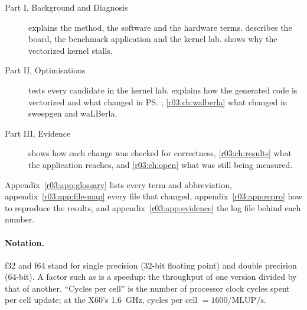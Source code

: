 \begin{description}
  \item[Part I, Background and Diagnosis]  explains the method, the
        software and the hardware terms.  describes the board, the
        benchmark application and the kernel lab.  shows why the
        vectorized kernel stalls.
  \item[Part II, Optimisations]  tests every candidate in the kernel
        lab.  explains how the generated code is vectorized and what
        changed in \ps{}; \cref{r03:ch:walberla} what changed in sweepgen and waLBerla.
  \item[Part III, Evidence]  shows how each change was checked
        for correctness, \cref{r03:ch:results} what the application reaches, and
        \cref{r03:ch:open} what was still being measured.
\end{description}
Appendix~\ref{r03:app:glossary} lists every term and abbreviation,
appendix~\ref{r03:app:file-map} every file that changed, appendix~\ref{r03:app:repro} how
to reproduce the results, and appendix~\ref{r03:app:evidence} the log file behind each
number.

\paragraph{Notation.} f32 and f64 stand for single precision (32-bit floating point) and
double precision (64-bit). A factor such as  is a speedup: the throughput of one
version divided by that of another. ``Cycles per cell'' is the number of processor clock
cycles spent per cell update; at the X60's 1.6~GHz, cycles per cell $= 1600 /
\text{MLUP/s}$.
